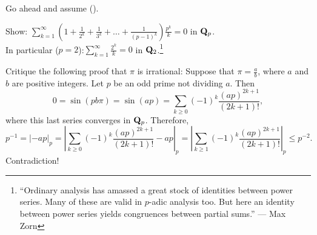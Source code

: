\begin{prob}\label{prob:padiclumber2} Go ahead and assume (\textdagger).

Show: $\displaystyle\sum_{k=1}^{\infty}\left(1+\frac{1}{2^k} + \frac{1}{3^k} + \dots + \frac{1}{(p-1)^k}\right) \frac{p^k}{k}=0$ in $\mathbf{Q}_p$. \\
In particular ($p=2$):\quad $\displaystyle\sum_{k=1}^{\infty}\frac{2^k}{k}=0$ in $\mathbf{Q}_2$.\footnote{``Ordinary analysis has amassed a great stock of identities between power series. Many of these are valid in $p$-adic analysis too. But here an identity between power series yields congruences between partial sums.'' --- Max Zorn}



\end{prob}



\begin{prob}\label{prob:fakeproofkoblitz} Critique the following proof that $\pi$ is irrational: Suppose that $\pi = \frac{a}{b}$, where $a$ and $b$ are positive integers. Let $p$ be an odd prime not dividing $a$. Then $$0 = \sin(pb \pi) = \sin(ap) = \sum_{k\ge 0} (-1)^k \frac{(ap)^{2k+1}}{(2k+1)!}, $$ 
where this last series converges in $\mathbf{Q}_p$. Therefore,
\[ p^{-1} = |-ap|_p = \left|\sum_{k\ge 0} (-1)^k \frac{(ap)^{2k+1}}{(2k+1)!} -ap\right|_p = \left|\sum_{k\ge 1} (-1)^k \frac{(ap)^{2k+1}}{(2k+1)!}\right|_p\le p^{-2}. \]
Contradiction! \label{ex:pi}
\end{prob}






